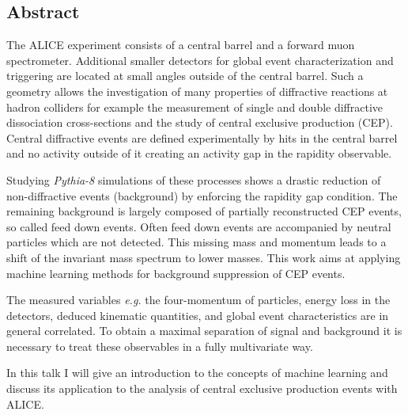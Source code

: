 \documentclass{article}
\begin{document}
\subsection*{Abstract}
The ALICE experiment consists of a central barrel and a forward muon
spectrometer. Additional smaller detectors for global event
characterization and triggering are located at small angles outside of
the central barrel. Such a geometry allows the investigation of many
properties of diffractive reactions at hadron colliders for example the
measurement of single and double diffractive dissociation cross-sections
and the study of central exclusive production (CEP). Central diffractive
events are defined experimentally by hits in the central barrel and no
activity outside of it creating an activity gap in the
rapidity observable.

Studying \emph{Pythia-8} simulations of these processes shows a drastic
reduction of non-diffractive events (background) by enforcing the
rapidity gap condition. The remaining background is largely composed of
partially reconstructed CEP events, so called feed down events. Often
feed down events are accompanied by neutral particles which are not
detected. This missing mass and momentum leads to a shift of the
invariant mass spectrum to lower masses. This work aims at applying machine
learning methods for background suppression of CEP events. 

The measured variables \emph{e.g.} the four-momentum of particles, energy loss in the 
detectors, deduced kinematic quantities, and global event characteristics are in general correlated. 
To obtain a maximal separation of signal and background it is necessary to treat these observables in a
fully multivariate way.

In this talk I will give an introduction to the concepts of machine learning and discuss its application to the 
analysis of central exclusive production events with ALICE.

\end{document}
